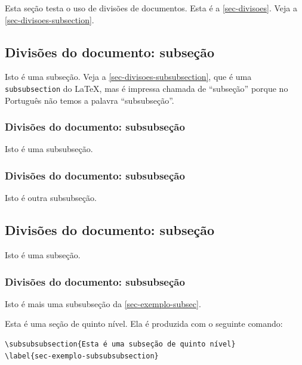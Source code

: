 Esta seção testa o uso de divisões de documentos. Esta é a
\autoref{sec-divisoes}. Veja a \autoref{sec-divisoes-subsection}.

\subsection{Divisões do documento: subseção}\label{sec-divisoes-subsection}

Isto é uma subseção. Veja a \autoref{sec-divisoes-subsubsection}, que é uma
\texttt{subsubsection} do \LaTeX, mas é impressa chamada de ``subseção'' porque
no Português não temos a palavra ``subsubseção''.

\subsubsection{Divisões do documento: subsubseção}
\label{sec-divisoes-subsubsection}

Isto é uma subsubseção.

\subsubsection{Divisões do documento: subsubseção}

Isto é outra subsubseção.

\subsection{Divisões do documento: subseção}\label{sec-exemplo-subsec}

Isto é uma subseção.

\subsubsection{Divisões do documento: subsubseção}

Isto é mais uma subsubseção da \autoref{sec-exemplo-subsec}.


\label{sec-exemplo-subsubsubsection}

Esta é uma seção de quinto nível. Ela é produzida com o seguinte comando:

\begin{verbatim}
\subsubsubsection{Esta é uma subseção de quinto nível}
\label{sec-exemplo-subsubsubsection}
\end{verbatim}

\label{sec-exemplo-subsubsubsection-outro}


